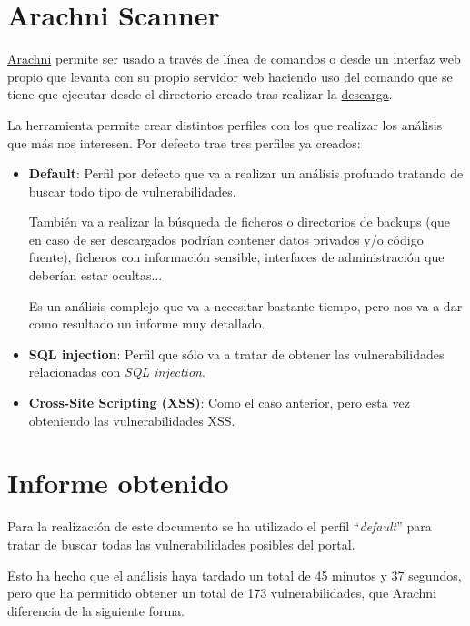 \documentclass{\ClassPath/viu-tfm-template}
\begin{document}
\section{Arachni Scanner}
\href{https://www.arachni-scanner.com/}{Arachni} permite ser usado a través de línea de comandos o desde un interfaz web propio que levanta con su propio servidor web haciendo uso del comando  que se tiene que ejecutar desde el directorio creado tras realizar la \href{https://www.arachni-scanner.com/download/}{descarga}.

La herramienta permite crear distintos perfiles con los que realizar los análisis que más nos interesen. Por defecto trae tres perfiles ya creados:

\begin{itemize}
    \item \textbf{Default}: Perfil por defecto que va a realizar un análisis profundo tratando de buscar todo tipo de vulnerabilidades.

    También va a realizar la búsqueda de ficheros o directorios de backups (que en caso de ser descargados podrían contener datos privados y/o código fuente), ficheros con información sensible, interfaces de administración que deberían estar ocultas...

    Es un análisis complejo que va a necesitar bastante tiempo, pero nos va a dar como resultado un informe muy detallado.

    \item \textbf{SQL injection}: Perfil que sólo va a tratar de obtener las vulnerabilidades relacionadas con \textit{SQL injection}.

    \item \textbf{Cross-Site Scripting (XSS)}: Como el caso anterior, pero esta vez obteniendo las vulnerabilidades XSS.
\end{itemize}

\section{Informe obtenido}

Para la realización de este documento se ha utilizado el perfil “\textit{default}” para tratar de buscar todas las vulnerabilidades posibles del portal.

Esto ha hecho que el análisis haya tardado un total de 45 minutos y 37 segundos, pero que ha permitido obtener un total de 173 vulnerabilidades, que Arachni diferencia de la siguiente forma.
\end{document}
